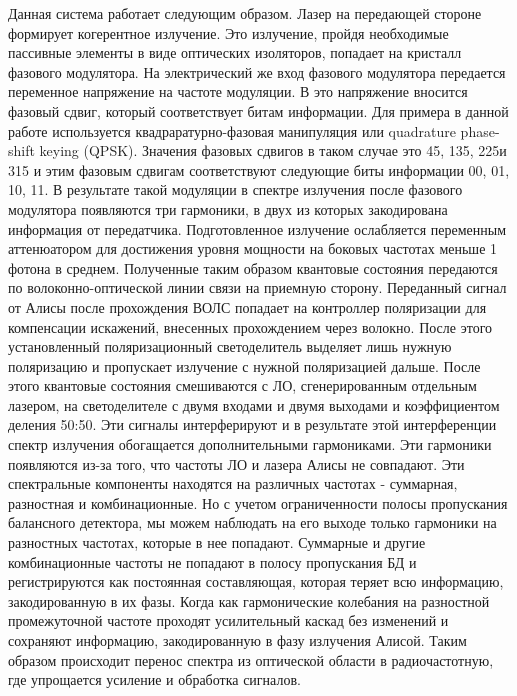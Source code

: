Данная система работает следующим образом. Лазер на передающей стороне формирует когерентное излучение. Это излучение, пройдя необходимые пассивные элементы в виде оптических изоляторов, попадает на кристалл фазового модулятора. На электрический же вход фазового модулятора передается переменное напряжение на частоте модуляции. В это напряжение вносится фазовый сдвиг, который соответствует битам информации. Для примера в данной работе используется квадраратурно-фазовая манипуляция или quadrature phase-shift keying (QPSK). Значения фазовых сдвигов в таком случае это {45\textdegree, 135\textdegree, 225\textdegree и 315\textdegree} и этим фазовым сдвигам соответствуют следующие биты информации {00, 01, 10, 11}. В результате такой модуляции в спектре излучения после фазового модулятора появляются три гармоники, в двух из которых закодирована информация от передатчика. Подготовленное излучение ослабляется переменным аттенюатором для достижения уровня мощности на боковых частотах меньше 1 фотона в среднем. Полученные таким образом квантовые состояния передаются по волоконно-оптической линии связи на приемную сторону.  
\newline Переданный сигнал от Алисы после прохождения ВОЛС попадает на контроллер поляризации для компенсации искажений, внесенных прохождением через волокно. После этого установленный поляризационный светоделитель выделяет лишь нужную поляризацию и пропускает излучение с нужной поляризацией дальше. После этого квантовые состояния смешиваются с ЛО, сгенерированным отдельным лазером, на светоделителе с двумя входами и двумя выходами и коэффициентом деления 50:50. Эти сигналы интерферируют и в результате этой интерференции спектр излучения обогащается дополнительными гармониками. Эти гармоники появляются из-за того, что частоты ЛО и лазера Алисы не совпадают. Эти спектральные компоненты находятся на различных частотах - суммарная, разностная и комбинационные. Но с учетом ограниченности полосы пропускания балансного детектора, мы можем наблюдать на его выходе только гармоники на разностных частотах, которые в нее попадают. Суммарные и другие комбинационные частоты не попадают в полосу пропускания БД и регистрируются как постоянная составляющая, которая теряет всю информацию, закодированную в их фазы. Когда как гармонические колебания на разностной промежуточной частоте проходят усилительный каскад без изменений и сохраняют информацию, закодированную в фазу излучения Алисой. Таким образом происходит перенос спектра из оптической области в радиочастотную, где упрощается усиление и обработка сигналов. 

